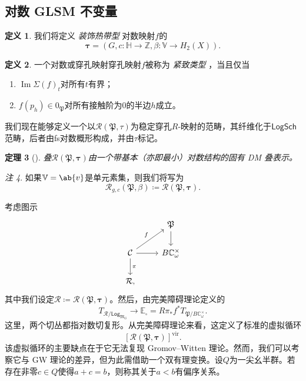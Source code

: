 \documentclass{amsart}
\newtheorem{thm}{定理}[section]
\theoremstyle{definition}
\newtheorem{defn}[thm]{定义}
\theoremstyle{remark}
\newtheorem{rmk}[thm]{注}
\theoremstyle{plain}
\theoremstyle{definition}
\theoremstyle{remark}
\DeclareMathOperator{\Ima}{Im}
\newcommand{\C}{\mathbb{C}}
\newcommand{\Z}{\mathbb{Z}}
\newcommand{\E}{\mathbb{E}}
\newcommand{\V}{\mathbb{V}}
\renewcommand{\H}{\mathbb{H}}
\newcommand{\mc}[1]{\mathcal{#1}}
\newcommand{\mf}[1]{\mathfrak{#1}}
\newcommand{\mr}[1]{\mathrm{#1}}
\newcommand{\ms}[1]{\mathsf{#1}}
\newcommand{\1}{\mathbf{1}}
\newcommand{\2}{\mathbf{2}}
\newcommand{\3}{\mathbf{3}}
\newcommand{\vir}{\mr{vir}}
\begin{document}
\subsection{对数 GLSM 不变量}%
\label{sub:Log GLSM invariants}

\begin{defn}
    我们将定义 \textit{装饰热带型} 对数映射\(f\)的
    \[ \bm{\tau} = (G, c \colon \H \to \Z, \beta \colon \V \to H_2(X)). \]
\end{defn}

\begin{defn}
一个对数或穿孔映射穿孔映射\(f\)被称为 \textit{ 紧致类型 }，当且仅当
    \begin{enumerate}
\item \(\Ima \Sigma(f)_t\)对所有\(t\)有界；
\item \(f(p_h) \in 0_{\mf{P}}\)对所有接触阶为\(0\)的半边\(h\)成立。
    \end{enumerate}
\end{defn}

我们现在能够定义一个以\(\mc{R}(\mf{P}, \tau)\)为稳定穿孔\(R\)-映射的范畴，其纤维化于\(\ms{LogSch}\)范畴，后者由fs对数概形构成，并由\(\tau\)标记。

\begin{thm}[{\cite{CJR2021,CJRpunctured}}]
叠\(\mc{R}(\mf{P},\bm{\tau})\)由一个带基本（亦即最小）对数结构的固有 DM 叠表示。
\end{thm}

\begin{rmk}
如果\(\V = \ab\{v\}\)是单元素集，则我们将写为
    \[ \mc{R}_{g, c}(\mf{P}, \beta) \coloneqq \mc{R}(\mf{P}, \bm{\tau}). \]
\end{rmk}

考虑图示
\begin{equation*}
\begin{tikzcd}
    & \mf{P} \ar{d} \\
    \mc{C} \ar{ur}{f} \ar{d}{\pi} \ar{r} & B \C_{\omega}^{\times} \\
    \mc{R},
\end{tikzcd}
\end{equation*}
其中我们设定\(\mc{R} \coloneqq \mc{R}(\mf{P}, \bm{\tau})\)。然后，由完美障碍理论定义的
\[ T_{\mc{R}/\ms{Log}_{\mf{M}_G}} \to \E_{\square} = R \pi_* f^* T_{\mf{P}/B\C_{\omega}^{\times}}. \]
这里，两个切丛都指对数切复形。从完美障碍理论来看，这定义了标准的虚拟循环
\[ [\mc{R}(\mf{P}, \bm{\tau})]^{\vir}. \]
该虚拟循环的主要缺点在于它无法复现 Gromov--Witten 理论。然而，我们可以考察它与 GW 理论的差异，但为此需借助一个双有理变换。设\(Q\)为一尖幺半群。若存在非零\(c \in Q\)使得\(a+c = b\)，则称其关于\(a < b\)有偏序关系。
\end{document}
